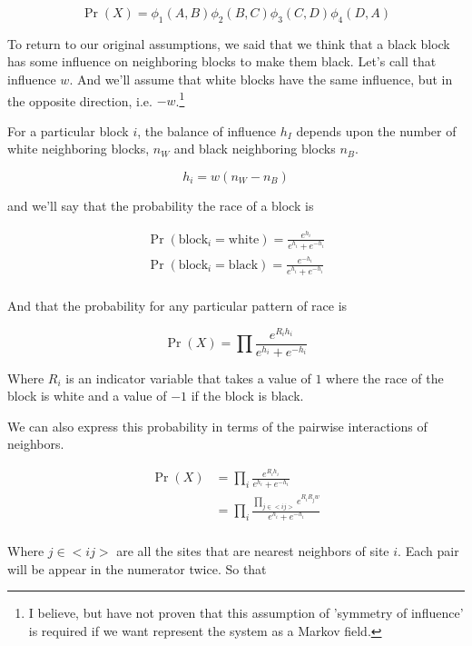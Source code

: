 \documentclass{article}
\begin{document}
\begin{equation}
\Pr(X) = \phi_1(A,B)\phi_2(B,C)\phi_3(C,D)\phi_4(D,A) 
\end{equation}


 
To return to our original assumptions, we said that we think that a
black block has some influence on neighboring blocks to make them
black. Let's call that influence $w$. And we'll assume that white
blocks have the same influence, but in the opposite direction,
i.e. $-w$.\footnote{I believe, but have not proven that this
  assumption of 'symmetry of influence' is required if we want
  represent the system as a Markov field.}


For a particular block $i$, the balance of influence $h_I$ depends upon the
number of white neighboring blocks, $n_W$ and black neighboring blocks $n_B$.

\begin{equation}
h_i = w(n_W - n_B)
\end{equation}

and we'll say that the probability the race of a block is

\begin{align}
\Pr(\text{block}_i = \text{white}) = \frac{e^{h_i}}{e^{h_i} + e^{-h_i}} \\
\Pr(\text{block}_i = \text{black}) = \frac{e^{-h_i}}{e^{h_i} + e^{-h_i}} \\
\end{align}

And that the probability for any particular pattern of race is

\begin{equation}
\Pr(X) = \prod\frac{e^{R_ih_i}}{e^{h_i} + e^{-h_i}}
\end{equation}

Where $R_i$ is an indicator variable that takes a value of
$1$ where the race of the block is white and a value of $-1$ if the
block is black.

We can also express this probability in terms of the pairwise interactions 
of neighbors.

\begin{align}
\Pr(X) &= \prod_i\frac{e^{R_ih_i}}{e^{h_i} + e^{-h_i}} \\
&= \prod_i\frac{\prod_{j \in <i j>}e^{R_iR_jw}}{e^{h_i} + e^{-h_i}} \\
\end{align}

Where $j \in <i j>$ are all the sites that are nearest neighbors of site $i$. Each pair will be appear in the numerator twice. So that 
\end{document}
